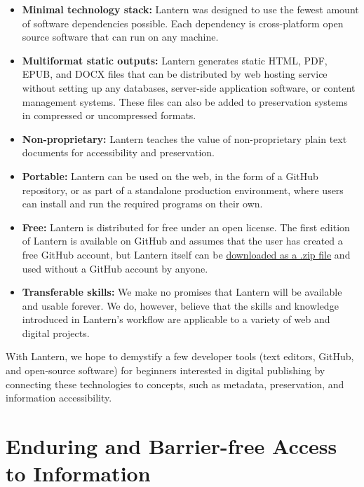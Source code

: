 \documentclass[
  11pt,
  openany]{book}
\begin{document}
\begin{itemize}
\item
  \textbf{Minimal technology stack:} Lantern was designed to use the fewest
  amount of software dependencies possible. Each dependency is cross-platform
  open source software that can run on any machine.
\item
  \textbf{Multiformat static outputs:} Lantern generates static HTML, PDF,
  EPUB, and DOCX files that can be distributed by web hosting service without
  setting up any databases, server-side application software, or content
  management systems. These files can also be added to preservation systems in
  compressed or uncompressed formats.
\item
  \textbf{Non-proprietary:} Lantern teaches the value of non-proprietary plain
  text documents for accessibility and preservation.
\item
  \textbf{Portable:} Lantern can be used on the web, in the form of a GitHub
  repository, or as part of a standalone production environment, where users
  can install and run the required programs on their own.
\item
  \textbf{Free:} Lantern is distributed for free under an open license. The
  first edition of Lantern is available on GitHub and assumes that the user
  has created a free GitHub account, but Lantern itself can be
  \href{https://github.com/nulib-oer/lantern/archive/refs/heads/main.zip}{downloaded
  as a .zip file} and used without a GitHub account by anyone.
\item
  \textbf{Transferable skills:} We make no promises that Lantern will be
  available and usable forever. We do, however, believe that the skills and
  knowledge introduced in Lantern's workflow are applicable to a variety of
  web and digital projects.
\end{itemize}

With Lantern, we hope to demystify a few developer tools (text editors,
GitHub, and open-source software) for beginners interested in digital
publishing by connecting these technologies to concepts, such as metadata,
preservation, and information accessibility.

\hypertarget{enduring-and-barrier-free-access-to-information}{%
\section{Enduring and Barrier-free Access to
Information}\label{enduring-and-barrier-free-access-to-information}}
\end{document}
